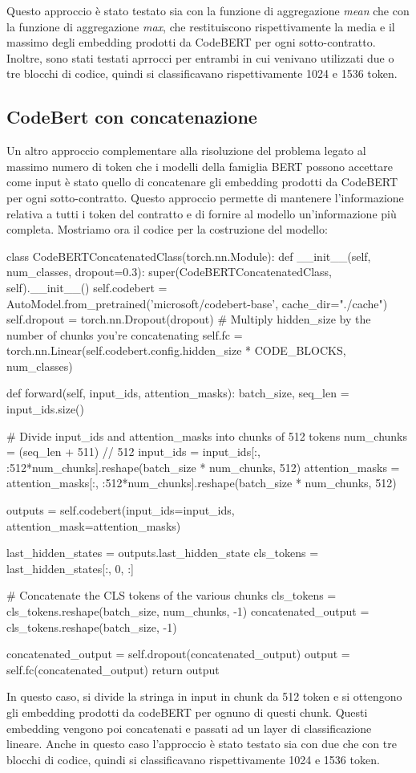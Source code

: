 \documentclass[../../Thesis.tex]{subfiles}
\begin{document}
Questo approccio è stato testato sia con la funzione di aggregazione \emph{mean} che con la funzione di aggregazione \emph{max}, che restituiscono rispettivamente la media e il massimo degli embedding prodotti da CodeBERT per ogni sotto-contratto. Inoltre, sono stati testati aprrocci per entrambi in cui venivano utilizzati due o tre blocchi di codice, quindi si classificavano rispettivamente 1024 e 1536 token.
\subsection{CodeBert con concatenazione}
Un altro approccio complementare alla risoluzione del problema legato al massimo numero di token che i modelli della famiglia BERT possono accettare come input è stato quello di concatenare gli embedding prodotti da CodeBERT per ogni sotto-contratto. Questo approccio permette di mantenere l'informazione relativa a tutti i token del contratto e di fornire al modello un'informazione più completa. Mostriamo ora il codice per la costruzione del modello:
\begin{python}
    class CodeBERTConcatenatedClass(torch.nn.Module):
    def __init__(self, num_classes, dropout=0.3):
        super(CodeBERTConcatenatedClass, self).__init__()
        self.codebert = AutoModel.from_pretrained('microsoft/codebert-base', cache_dir="./cache")
        self.dropout = torch.nn.Dropout(dropout)
        # Multiply hidden_size by the number of chunks you're concatenating
        self.fc = torch.nn.Linear(self.codebert.config.hidden_size * CODE_BLOCKS, num_classes)

    def forward(self, input_ids, attention_masks):
        batch_size, seq_len = input_ids.size()

        # Divide input_ids and attention_masks into chunks of 512 tokens
        num_chunks = (seq_len + 511) // 512
        input_ids = input_ids[:, :512*num_chunks].reshape(batch_size * num_chunks, 512)
        attention_masks = attention_masks[:, :512*num_chunks].reshape(batch_size * num_chunks, 512)

        outputs = self.codebert(input_ids=input_ids, attention_mask=attention_masks)

        last_hidden_states = outputs.last_hidden_state
        cls_tokens = last_hidden_states[:, 0, :]

        # Concatenate the CLS tokens of the various chunks
        cls_tokens = cls_tokens.reshape(batch_size, num_chunks, -1)
        concatenated_output = cls_tokens.reshape(batch_size, -1)

        concatenated_output = self.dropout(concatenated_output)
        output = self.fc(concatenated_output)
        return output
\end{python}
In questo caso, si divide la stringa in input in chunk da 512 token e si ottengono gli embedding prodotti da codeBERT per ognuno di questi chunk. Questi embedding vengono poi concatenati e passati ad un layer di classificazione lineare. Anche in questo caso l'approccio è stato testato sia con due che con tre blocchi di codice, quindi si classificavano rispettivamente 1024 e 1536 token. 
\end{document}
